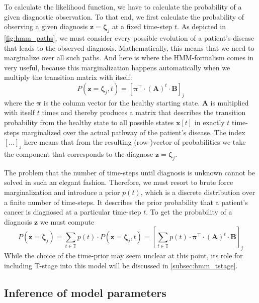 \documentclass[../ms.tex]{subfiles}
\begin{document}
To calculate the likelihood function, we have to calculate the probability of a given diagnostic observation. To that end, we first calculate the probability of observing a given diagnosis $\mathbf{z} = \boldsymbol{\zeta}_j$ at a fixed time-step $t$. As depicted in \cref{fig:hmm_paths}, we must consider every possible evolution of a patient’s disease that leads to the observed diagnosis. Mathematically, this means that we need to marginalize over all such paths. And here is where the HMM-formalism comes in very useful, because this marginalization happens automatically when we multiply the transition matrix with itself:
%
\begin{equation}
    P \left( \mathbf{z} = \boldsymbol{\zeta}_j , t \right) = \left[ \boldsymbol{\pi}^\top \cdot (\mathbf{A})^t \cdot \mathbf{B} \right]_j
\end{equation}
%
where the $\boldsymbol{\pi}$ is the column vector for the healthy starting state. $\mathbf{A}$ is multiplied with itself $t$ times and thereby produces a matrix that describes the transition probability from the healthy state to all possible states $\mathbf{x}[t]$ in exactly $t$ time-steps marginalized over the actual pathway of the patient’s disease. The index $[\ldots]_j$ here means that from the resulting (row-)vector of probabilities we take the component that corresponds to the diagnose $\mathbf{z} = \boldsymbol{\zeta}_j$.

The problem that the number of time-steps until diagnosis is unknown cannot be solved in such an elegant fashion. Therefore, we must resort to brute force marginalization and introduce a prior $p(t)$, which is a discrete distribution over a finite number of time-steps. It describes the prior probability that a patient's cancer is diagnosed at a particular time-step $t$. To get the probability of a diagnosis $\mathbf{z}$ we must compute
%
\begin{equation} \label{eq:hmm_marginalize}
    P\left( \mathbf{z} = \boldsymbol{\zeta}_j \right) = \sum_{t \in \mathbb{T}}{p(t) \cdot P\left( \mathbf{z} = \boldsymbol{\zeta}_j , t \right)} = \left[ \sum_{t \in \mathbb{T}}{p(t) \cdot \boldsymbol{\pi}^\top \cdot (\mathbf{A})^t \cdot \mathbf{B}} \right]_j
\end{equation}
%
While the choice of the time-prior may seem unclear at this point, its role for including T-stage into this model will be discussed in \cref{subsec:hmm_tstage}.

\subsection{Inference of model parameters}
\label{subsec:hmm_inference}
\end{document}
